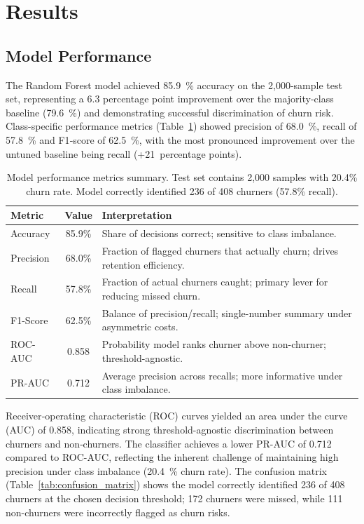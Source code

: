 \documentclass[12pt]{article}
\begin{document}
\section{Results}
\subsection{Model Performance}
The Random Forest model achieved 85.9~\% accuracy on the 2,000-sample test set, representing a 6.3 percentage point improvement over the majority-class baseline (79.6~\%) and demonstrating successful discrimination of churn risk. Class-specific performance metrics (Table~\ref{tab:model_performance}) showed precision of 68.0~\%, recall of 57.8~\% and F1‑score of 62.5~\%, with the most pronounced improvement over the untuned baseline being recall (+21~percentage points).

\begin{table}[H]
\centering
\small
\caption{Model performance metrics summary. Test set contains 2,000 samples with 20.4\% churn rate. Model correctly identified 236 of 408 churners (57.8\% recall).}
\label{tab:model_performance}
\begin{tabular}{lcp{9.5cm}}
\toprule
\textbf{Metric} & \textbf{Value} & \textbf{Interpretation} \\
\midrule
Accuracy & 85.9\% & Share of decisions correct; sensitive to class imbalance. \\
\cmidrule(lr){1-3}
Precision & 68.0\% & Fraction of flagged churners that actually churn; drives retention efficiency. \\
\cmidrule(lr){1-3}
Recall & 57.8\% & Fraction of actual churners caught; primary lever for reducing missed churn. \\
\cmidrule(lr){1-3}
F1-Score & 62.5\% & Balance of precision/recall; single-number summary under asymmetric costs. \\
\cmidrule(lr){1-3}
ROC-AUC & 0.858 & Probability model ranks churner above non-churner; threshold-agnostic. \\
\cmidrule(lr){1-3}
PR-AUC & 0.712 & Average precision across recalls; more informative under class imbalance. \\
\bottomrule
\end{tabular}
\end{table}

Receiver‑operating characteristic (ROC) curves yielded an area under the curve (AUC) of 0.858, indicating strong threshold-agnostic discrimination between churners and non‑churners. The classifier achieves a lower PR-AUC of 0.712 compared to ROC-AUC, reflecting the inherent challenge of maintaining high precision under class imbalance (20.4~\% churn rate). The confusion matrix (Table~\ref{tab:confusion_matrix}) shows the model correctly identified 236 of 408 churners at the chosen decision threshold; 172 churners were missed, while 111 non-churners were incorrectly flagged as churn risks.
\end{document}
